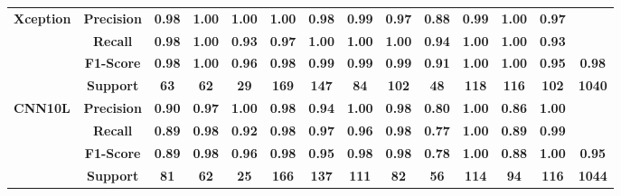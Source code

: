 \begin{table}[h]
{\begin{tabular}{lccccccccccccc}
        \midrule
        
        \textbf{Xception} & \textbf{Precision} & \textbf{0.98} & \textbf{1.00} & \textbf{1.00} & \textbf{1.00} & \textbf{0.98} & \textbf{0.99} & \textbf{0.97} & \textbf{0.88} & \textbf{0.99} & \textbf{1.00} & \textbf{0.97} & \textbf{}\\
        \textbf{} & \textbf{Recall} & \textbf{0.98} & \textbf{1.00} & \textbf{0.93} & \textbf{0.97} & \textbf{1.00} & \textbf{1.00} & \textbf{1.00} & \textbf{0.94} & \textbf{1.00} & \textbf{1.00} & \textbf{0.93} & \textbf{}\\
        \textbf{} & \textbf{F1-Score} & \textbf{0.98} & \textbf{1.00} & \textbf{0.96} & \textbf{0.98} & \textbf{0.99} & \textbf{0.99} & \textbf{0.99} & \textbf{0.91} & \textbf{1.00} & \textbf{1.00} & \textbf{0.95} & \textbf{0.98}\\
        \textbf{} & \textbf{Support} & \textbf{63} & \textbf{62} & \textbf{29} & \textbf{169} & \textbf{147} & \textbf{84} & \textbf{102} & \textbf{48} & \textbf{118} & \textbf{116} & \textbf{102} & \textbf{1040}\\

        \midrule

        \textbf{CNN10L} & \textbf{Precision} & \textbf{0.90} & \textbf{0.97} & \textbf{1.00} & \textbf{0.98} & \textbf{0.94} & \textbf{1.00} & \textbf{0.98} & \textbf{0.80} & \textbf{1.00} & \textbf{0.86} & \textbf{1.00} & \textbf{}\\
        \textbf{} & \textbf{Recall} & \textbf{0.89} & \textbf{0.98} & \textbf{0.92} & \textbf{0.98} & \textbf{0.97} & \textbf{0.96} & \textbf{0.98} & \textbf{0.77} & \textbf{1.00} & \textbf{0.89} & \textbf{0.99} & \textbf{}\\
        \textbf{} & \textbf{F1-Score} & \textbf{0.89} & \textbf{0.98} & \textbf{0.96} & \textbf{0.98} & \textbf{0.95} & \textbf{0.98} & \textbf{0.98} & \textbf{0.78} & \textbf{1.00} & \textbf{0.88} & \textbf{1.00} & \textbf{0.95}\\
        \textbf{} & \textbf{Support} & \textbf{81} & \textbf{62} & \textbf{25} & \textbf{166} & \textbf{137} & \textbf{111} & \textbf{82} & \textbf{56} & \textbf{114} & \textbf{94} & \textbf{116} & \textbf{1044}\\

        \midrule


\end{tabular}}
\end{table}
